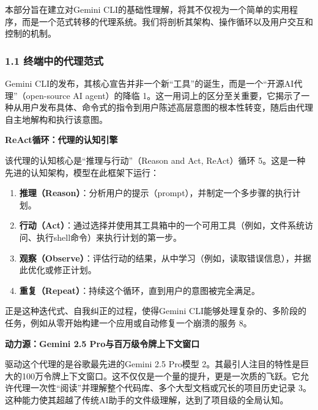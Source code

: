 \documentclass[a4paper,12pt]{article}
\providecommand{\tightlist}{%
  \setlength{\itemsep}{0pt}\setlength{\parskip}{0pt}}
\begin{document}
\begin{multicols}{2}
    本部分旨在建立对Gemini
    CLI的基础性理解，将其不仅视为一个简单的实用程序，而是一个范式转移的代理系统。我们将剖析其架构、操作循环以及用户交互和控制的机制。

    \subsubsection{\texorpdfstring{\textbf{1.1
    终端中的代理范式}}{1.1 终端中的代理范式}}\label{ux7ec8ux7aefux4e2dux7684ux4ee3ux7406ux8303ux5f0f}

    Gemini
    CLI的发布，其核心宣告并非一个新``工具''的诞生，而是一个``开源AI代理''（open-source
    AI agent）的降临
    1。这一用词上的区分至关重要，它揭示了一种从用户发布具体、命令式的指令到用户陈述高层意图的根本性转变，随后由代理自主地解构和执行该意图。

    \textbf{ReAct循环：代理的认知引擎}

    该代理的认知核心是``推理与行动''（Reason and Act, ReAct）循环
    5。这是一种先进的认知架构，模型在此框架下运行：

    \begin{enumerate}
    \def\labelenumi{\arabic{enumi}.}
    \tightlist
    \item
      \textbf{推理（Reason）}：分析用户的提示（prompt），并制定一个多步骤的执行计划。\\
    \item
      \textbf{行动（Act）}：通过选择并使用其工具箱中的一个可用工具（例如，文件系统访问、执行shell命令）来执行计划的第一步。\\
    \item
      \textbf{观察（Observe）}：评估行动的结果，从中学习（例如，读取错误信息），并据此优化或修正计划。\\
    \item
      \textbf{重复（Repeat）}：持续这个循环，直到用户的意图被完全满足。
    \end{enumerate}

    正是这种迭代式、自我纠正的过程，使得Gemini
    CLI能够处理复杂的、多阶段的任务，例如从零开始构建一个应用或自动修复一个崩溃的服务
    8。

    \textbf{动力源：Gemini 2.5 Pro与百万级令牌上下文窗口}

    驱动这个代理的是谷歌最先进的Gemini 2.5 Pro模型
    2。其最引人注目的特性是巨大的100万令牌上下文窗口。这不仅仅是一个量的提升，更是一次质的飞跃。它允许代理一次性``阅读''并理解整个代码库、多个大型文档或冗长的项目历史记录
    3。这种能力使其超越了传统AI助手的文件级理解，达到了项目级的全局认知。


\end{multicols}
\end{document}
